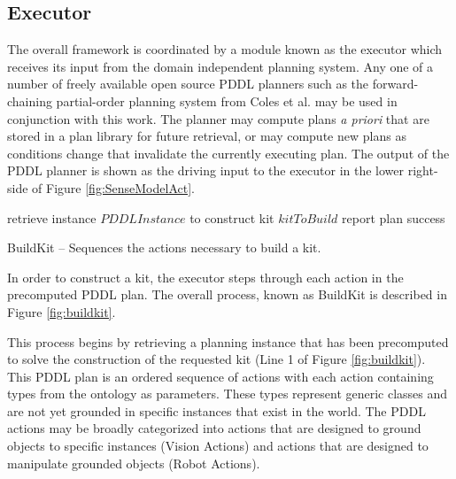 \subsection{Executor}
The overall framework
is coordinated by a module known as the executor
which receives its input from the 
domain independent planning system. 
Any one of a number of freely available
open source PDDL planners
such as the forward-chaining partial-order planning system from 
Coles et al. \cite{Coles.ICAPS.2010}
may be used in conjunction with this 
work. The planner may compute plans {\it a priori} that are
stored in a plan library for future retrieval, or may compute
new plans as conditions change that invalidate the currently
executing plan. The output of the PDDL planner is shown as
the driving input to the executor in the lower right-side of
Figure \ref{fig:SenseModelAct}.

%
\begin{algorithm}[h!]

 	retrieve instance $PDDLInstance$ to construct kit $kitToBuild$\;
 	report plan success\;
\caption{{\sc BuildKit} -- Sequences the actions necessary to build a kit.}
\label{fig:buildkit}
\end{algorithm}
%


In order to construct a kit, the executor steps through each
action in
the precomputed PDDL plan. The overall process, known as {\sc BuildKit} is described in Figure
\ref{fig:buildkit}. 

This process begins by retrieving a planning instance that has been 
precomputed to solve the construction of the requested kit (Line 1 of 
Figure \ref{fig:buildkit}). This PDDL
plan is an ordered sequence of actions with each action
containing types from the ontology as parameters. These
types represent generic classes and are not yet grounded
in specific instances that exist in the world. The PDDL
actions may be broadly categorized into actions that are
designed to ground objects to specific instances (Vision Actions)
and actions that are designed to manipulate grounded objects (Robot 
Actions). 

